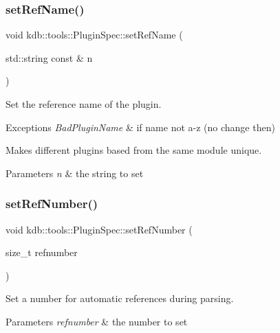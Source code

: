 \subsubsection{\texorpdfstring{set\+Ref\+Name()}{setRefName()}}
{\footnotesize\ttfamily void kdb\+::tools\+::\+Plugin\+Spec\+::set\+Ref\+Name (\begin{DoxyParamCaption}\item[{std\+::string const \&}]{n }\end{DoxyParamCaption})}



Set the reference name of the plugin. 


\begin{DoxyExceptions}{Exceptions}
{\em Bad\+Plugin\+Name} & if name not a-\/z (no change then)\\
\hline
\end{DoxyExceptions}
Makes different plugins based from the same module unique.


\begin{DoxyParams}{Parameters}
{\em n} & the string to set \\
\hline
\end{DoxyParams}
\mbox{\label{classkdb_1_1tools_1_1PluginSpec_a927d2ce32f321136f626c6489e47089e}} 
\subsubsection{\texorpdfstring{set\+Ref\+Number()}{setRefNumber()}}
{\footnotesize\ttfamily void kdb\+::tools\+::\+Plugin\+Spec\+::set\+Ref\+Number (\begin{DoxyParamCaption}\item[{size\+\_\+t}]{refnumber }\end{DoxyParamCaption})}



Set a number for automatic references during parsing. 


\begin{DoxyParams}{Parameters}
{\em refnumber} & the number to set \\
\hline
\end{DoxyParams}
\mbox{\label{classkdb_1_1tools_1_1PluginSpec_a26c3e9943430571562ad466ac70ce4d6}} 
